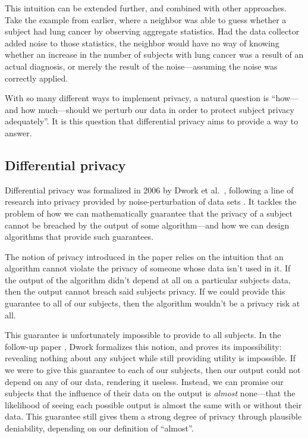 \documentclass[a4paper,12pt]{article}
\begin{document}
This intuition can be extended further, and combined with other approaches. Take the example from earlier, where a neighbor was able to guess whether a subject had lung cancer by observing aggregate statistics. Had the data collector added noise to those statistics, the neighbor would have no way of knowing whether an increase in the number of subjects with lung cancer was a result of an actual diagnosis, or merely the result of the noise---assuming the noise was correctly applied. 

With so many different ways to implement privacy, a natural question is ``how---and how much---should we perturb our data in order to protect subject privacy adequately''. It is this question that differential privacy aims to provide a way to answer.

\subsection{Differential privacy \label{sec:promise}}

Differential privacy was formalized in 2006 by Dwork et al.\ \cite{dworketal2006}, following a line of research into privacy provided by noise-perturbation of data sets \cite{precursor_2003,precursor_2004,precusor_2005}. It tackles the problem of how we can mathematically guarantee that the privacy of a subject cannot be breached by the output of some algorithm---and how we can design algorithms that provide such guarantees.

The notion of privacy introduced in the paper relies on the intuition that an algorithm cannot violate the privacy of someone whose data isn't used in it. If the output of the algorithm didn't depend at all on a particular subjects data, then the output cannot breach said subjects privacy. If we could provide this guarantee to all of our subjects, then the algorithm wouldn't be a privacy risk at all.

This guarantee is unfortunately impossible to provide to all subjects. In the follow-up paper \cite{dwork2006_diffpriv}, Dwork formalizes this notion, and proves its impossibility: revealing nothing about any subject while still providing utility is impossible. If we were to give this guarantee to each of our subjects, then our output could not depend on any of our data, rendering it useless. Instead, we can promise our subjects that the influence of their data on the output is \emph{almost} none---that the likelihood of seeing each possible output is almost the same with or without their data. This guarantee still gives them a strong degree of privacy through plausible deniability, depending on our definition of ``almost''.
\end{document}
